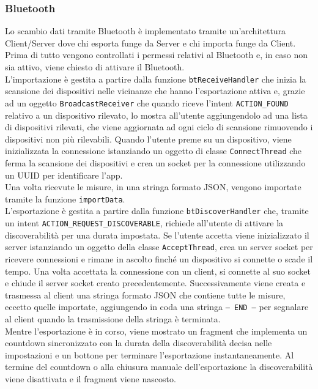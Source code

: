 \documentclass[11pt]{article}
\begin{document}
\subsubsection{Bluetooth}
Lo scambio dati tramite Bluetooth è implementato tramite un'architettura Client/Server dove chi esporta funge da Server e chi importa funge da Client. \\
Prima di tutto vengono controllati i permessi relativi al Bluetooth e, in caso non sia attivo, viene chiesto di attivare il Bluetooth. \\
L'importazione è gestita a partire dalla funzione \texttt{btReceiveHandler} che inizia la scansione dei dispositivi nelle vicinanze che hanno l'esportazione attiva e, grazie ad un oggetto \texttt{BroadcastReceiver} che quando riceve l'intent \texttt{ACTION\_FOUND} relativo a un dispositivo rilevato, lo mostra all'utente aggiungendolo ad una lista di dispositivi rilevati, che viene aggiornata ad ogni ciclo di scansione rimuovendo i dispositivi non più rilevabili. Quando l'utente preme su un dispositivo, viene inizializzata la connessione istanziando un oggetto di classe \texttt{ConnectThread} che ferma la scansione dei dispositivi e crea un socket per la connessione utilizzando un UUID per identificare l'app. \\
Una volta ricevute le misure, in una stringa formato JSON, vengono importate tramite la funzione \texttt{importData}. \\
L'esportazione è gestita a partire dalla funzione \texttt{btDiscoverHandler} che, tramite un intent \texttt{ACTION\_REQUEST\_DISCOVERABLE}, richiede all'utente di attivare la discoverabilità per una durata impostata. Se l'utente accetta viene inizializzato il server istanziando un oggetto della classe \texttt{AcceptThread}, crea un server socket per ricevere connessioni e rimane in ascolto finché un dispositivo si connette o scade il tempo. Una volta accettata la connessione con un client, si connette al suo socket e chiude il server socket creato precedentemente. Successivamente viene creata e trasmessa al client una stringa formato JSON che contiene tutte le misure, eccetto quelle importate, aggiungendo in coda una stringa \texttt{-- END --} per segnalare al client quando la trasmissione della stringa è terminata. \\
Mentre l'esportazione è in corso, viene mostrato un fragment che implementa un countdown sincronizzato con la durata della discoverabilità decisa nelle impostazioni e un bottone per terminare l'esportazione instantaneamente. Al termine del countdown o alla chiusura manuale dell'esportazione la discoverabilità viene disattivata e il fragment viene nascosto.
\pagebreak
\end{document}
